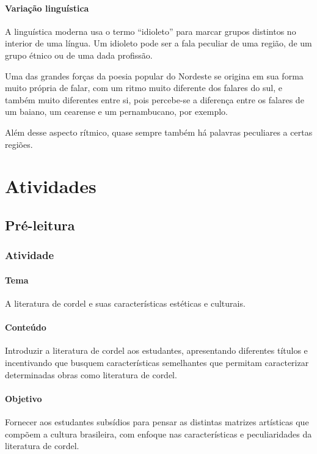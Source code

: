 \documentclass[11pt]{extarticle}
\begin{document}
\paragraph{Variação linguística}

A linguística moderna usa o termo “idioleto” para marcar grupos distintos no
interior de uma língua. Um idioleto pode ser a fala peculiar de uma região, de
um grupo étnico ou de uma dada profissão. 

Uma das grandes forças da poesia popular do Nordeste se origina em sua forma
muito própria de falar, com um ritmo muito diferente dos falares do sul, e
também muito diferentes entre si, pois percebe-se a diferença entre os falares
de um baiano, um cearense e um pernambucano, por exemplo.

Além desse aspecto rítmico, quase sempre também há palavras peculiares a certas
regiões. 


\section{Atividades}

\subsection{Pré-leitura}

\subsubsection{Atividade}


\paragraph{Tema} A literatura de cordel e suas características estéticas e culturais.

\paragraph{Conteúdo} Introduzir a literatura de cordel aos estudantes, apresentando diferentes títulos e incentivando que busquem características semelhantes que permitam caracterizar determinadas obras como literatura de cordel.

\paragraph{Objetivo} Fornecer aos estudantes subsídios para pensar as distintas matrizes artísticas que compõem a cultura brasileira, com enfoque nas características e peculiaridades da literatura de cordel.
\end{document}

